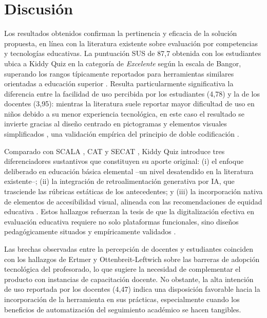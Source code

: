 \section{Discusión}

Los resultados obtenidos confirman la pertinencia y eficacia de la solución propuesta, en línea con la literatura existente sobre evaluación por competencias y tecnologías educativas. La puntuación SUS de 87,7 obtenida con los estudiantes ubica a Kiddy Quiz en la categoría de \textit{Excelente} según la escala de Bangor, superando los rangos típicamente reportados para herramientas similares orientadas a educación superior \cite{ref10_cat,ref21_scala_universidad}. Resulta particularmente significativa la diferencia entre la facilidad de uso percibida por los estudiantes (4,78) y la de los docentes (3,95): mientras la literatura suele reportar mayor dificultad de uso en niños debido a su menor experiencia tecnológica, en este caso el resultado se invierte gracias al diseño centrado en pictogramas y elementos visuales simplificados \cite{ref40_mayer,ref48_nielsen}, una validación empírica del principio de doble codificación \cite{ref43_paivio}.

Comparado con SCALA \cite{ref21_scala_universidad}, CAT \cite{ref10_cat} y SECAT \cite{ref11_secat}, Kiddy Quiz introduce tres diferenciadores sustantivos que constituyen su aporte original: (i) el enfoque deliberado en educación básica elemental --un nivel desatendido en la literatura existente--; (ii) la integración de retroalimentación generativa por IA, que trasciende las rúbricas estáticas de los antecedentes; y (iii) la incorporación nativa de elementos de accesibilidad visual, alineada con las recomendaciones de equidad educativa \cite{ref42_cabero}. Estos hallazgos refuerzan la tesis de que la digitalización efectiva en evaluación educativa requiere no solo plataformas funcionales, sino diseños pedagógicamente situados y empíricamente validados \cite{ref14_anderson,ref27_blackwiliam}.

Las brechas observadas entre la percepción de docentes y estudiantes coinciden con los hallazgos de Ertmer y Ottenbreit-Leftwich \cite{ref08_ertmer} sobre las barreras de adopción tecnológica del profesorado, lo que sugiere la necesidad de complementar el producto con instancias de capacitación docente. No obstante, la alta intención de uso reportada por los docentes (4,47) indica una disposición favorable hacia la incorporación de la herramienta en sus prácticas, especialmente cuando los beneficios de automatización del seguimiento académico se hacen tangibles.
